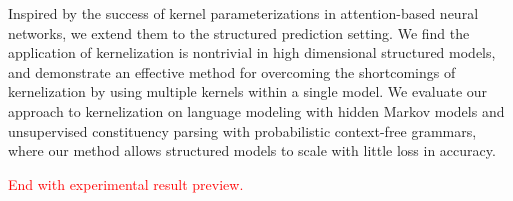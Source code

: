 Inspired by the success of kernel parameterizations in attention-based neural networks, we extend them to the structured prediction setting.
We find the application of kernelization is nontrivial in high dimensional structured models, and demonstrate an effective method for overcoming the shortcomings of kernelization by using multiple kernels within a single model.
We evaluate our approach to kernelization on language modeling with hidden Markov models and unsupervised constituency parsing with probabilistic context-free grammars, where our method allows structured models to scale with little loss in accuracy.


\textcolor{red}{End with experimental result preview.}

